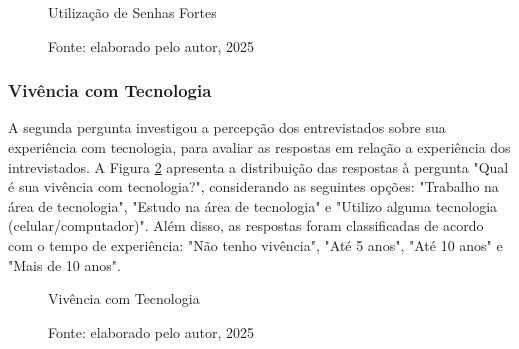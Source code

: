 \documentclass[12pt]{article}
\begin{document}
\begin{figure}[!htbp]
  \centering
  \caption{Utilização de Senhas Fortes}
  \caption*{Fonte: elaborado pelo autor, 2025}
  \label{fig:resposta_1}
\end{figure}
\FloatBarrier

\subsubsection{Vivência com Tecnologia}

A segunda pergunta investigou a percepção dos entrevistados sobre sua experiência
com tecnologia, para avaliar as respostas em relação a experiência dos intrevistados.
A Figura \ref{fig:resposta_2} apresenta a distribuição das respostas à pergunta
"Qual é sua vivência com tecnologia?", considerando as seguintes opções:
"Trabalho na área de tecnologia", "Estudo na área de tecnologia" e "Utilizo alguma
tecnologia (celular/computador)".
Além disso, as respostas foram classificadas de acordo com o tempo de experiência:
"Não tenho vivência", "Até 5 anos", "Até 10 anos" e "Mais de 10 anos".

\begin{figure}[htb]
    \centering
    \caption{Vivência com Tecnologia}
  \caption*{Fonte: elaborado pelo autor, 2025}
  \label{fig:resposta_2}
\end{figure}
\FloatBarrier
\end{document}
